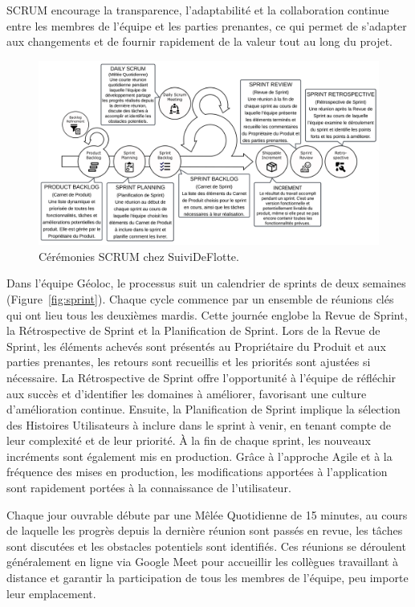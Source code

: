 SCRUM encourage la transparence, l'adaptabilité et la collaboration continue entre les membres de l'équipe et les parties prenantes, ce qui permet de s'adapter aux changements et de fournir rapidement de la valeur tout au long du projet.

\begin{figure}[h]
    \centering
    \includegraphics[width=\textwidth]{img/agile-02}
    \caption{Cérémonies SCRUM chez SuiviDeFlotte.}
    \label{fig:agile}
\end{figure}

Dans l'équipe Géoloc, le processus suit un calendrier de sprints de deux semaines (Figure~\ref{fig:sprint}). Chaque cycle commence par un ensemble de réunions clés qui ont lieu tous les deuxièmes mardis. Cette journée englobe la Revue de Sprint, la Rétrospective de Sprint et la Planification de Sprint. Lors de la Revue de Sprint, les éléments achevés sont présentés au Propriétaire du Produit et aux parties prenantes, les retours sont recueillis et les priorités sont ajustées si nécessaire. La Rétrospective de Sprint offre l'opportunité à l'équipe de réfléchir aux succès et d'identifier les domaines à améliorer, favorisant une culture d'amélioration continue. Ensuite, la Planification de Sprint implique la sélection des Histoires Utilisateurs à inclure dans le sprint à venir, en tenant compte de leur complexité et de leur priorité. À la fin de chaque sprint, les nouveaux incréments sont également mis en production. Grâce à l'approche Agile et à la fréquence des mises en production, les modifications apportées à l'application sont rapidement portées à la connaissance de l'utilisateur.

Chaque jour ouvrable débute par une Mêlée Quotidienne de 15 minutes, au cours de laquelle les progrès depuis la dernière réunion sont passés en revue, les tâches sont discutées et les obstacles potentiels sont identifiés. Ces réunions se déroulent généralement en ligne via Google Meet pour accueillir les collègues travaillant à distance et garantir la participation de tous les membres de l'équipe, peu importe leur emplacement.

